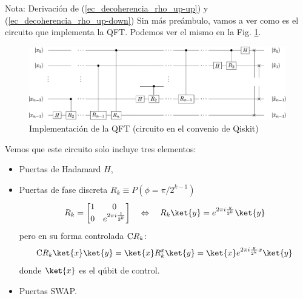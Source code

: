 \documentclass[a4paper,11pt]{book} %
\numberwithin{equation}{chapter}
\newcommand{\cg}[1]{{\rm C}#1}
\begin{document}
\begin{mybox_blue}{Nota: Derivación de (\ref{ec_decoherencia_rho_up-up}) y  (\ref{ec_decoherencia_rho_up-down})}
Sin más preámbulo, vamos a ver como es el circuito que implementa la QFT. Podemos ver el mismo en la Fig. \ref{Fig_QFT_circuit}.

	\begin{figure}[H]
	\centering 
	\includegraphics[width=1\linewidth]{Figuras/Fig_QFT_circuit.png}
	\caption{Implementación de la QFT (circuito en el convenio de Qiskit)}
	\label{Fig_QFT_circuit}
	\end{figure}

Vemos que este circuito solo incluye tres elementos:
\begin{itemize}
	\item Puertas de Hadamard $H$,
	\item Puertas de fase discreta $R_k \equiv P (\phi = \pi/2^{k-1})$
		\begin{equation}
		R_k = \begin{bmatrix}
		1 & 0 \\ 0 & e^{2 \pi i \frac{1}{2^k}}
		\end{bmatrix} \quad \Leftrightarrow \quad R_k \ket{y} = e^{2 \pi i \frac{y}{2^k}} \ket{y}
		\end{equation}
		pero en su forma controlada $\cg{R_k}$:
			\begin{equation} \label{ec_QFT_CRk}
			\cg{R_k}\ket{x}\ket{y} = \ket{x}R^{x}_{k}\ket{y}  = \ket{x}  e^{2 \pi i   \frac{y}{2^{k}}x}\ket{y}
			\end{equation}
		donde $\ket{x}$ es el qúbit de control.
	\item Puertas SWAP.
\end{itemize}


\end{mybox_blue}
\end{document}
